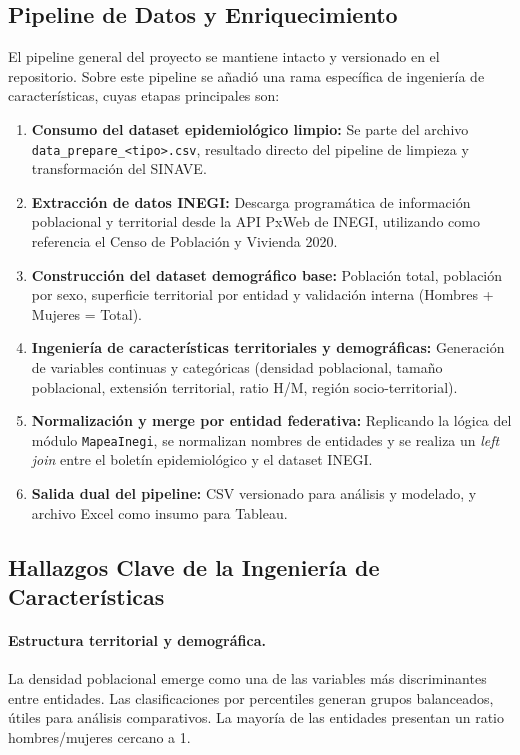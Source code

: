 \documentclass[12pt,letterpaper]{article}
\newcommand{\code}[1]{\texttt{\small #1}}
\begin{document}
\subsection{Pipeline de Datos y Enriquecimiento}

El pipeline general del proyecto se mantiene intacto y versionado en el repositorio. Sobre este pipeline se añadió una rama específica de ingeniería de características, cuyas etapas principales son:

\begin{enumerate}
    \item \textbf{Consumo del dataset epidemiológico limpio:} Se parte del archivo \code{data\_prepare\_\allowbreak <tipo>.csv}, resultado directo del pipeline de limpieza y transformación del SINAVE.
    \item \textbf{Extracción de datos INEGI:} Descarga programática de información poblacional y territorial desde la API PxWeb de INEGI, utilizando como referencia el Censo de Población y Vivienda 2020.
    \item \textbf{Construcción del dataset demográfico base:} Población total, población por sexo, superficie territorial por entidad y validación interna (Hombres + Mujeres = Total).
    \item \textbf{Ingeniería de características territoriales y demográficas:} Generación de variables continuas y categóricas (densidad poblacional, tamaño poblacional, extensión territorial, ratio H/M, región socio-territorial).
    \item \textbf{Normalización y merge por entidad federativa:} Replicando la lógica del módulo \code{MapeaInegi}, se normalizan nombres de entidades y se realiza un \textit{left join} entre el boletín epidemiológico y el dataset INEGI.
    \item \textbf{Salida dual del pipeline:} CSV versionado para análisis y modelado, y archivo Excel como insumo para Tableau.
\end{enumerate}

\subsection{Hallazgos Clave de la Ingeniería de Características}

\paragraph{Estructura territorial y demográfica.}
La densidad poblacional emerge como una de las variables más discriminantes entre entidades. Las clasificaciones por percentiles generan grupos balanceados, útiles para análisis comparativos. La mayoría de las entidades presentan un ratio hombres/mujeres cercano a 1.
\end{document}
